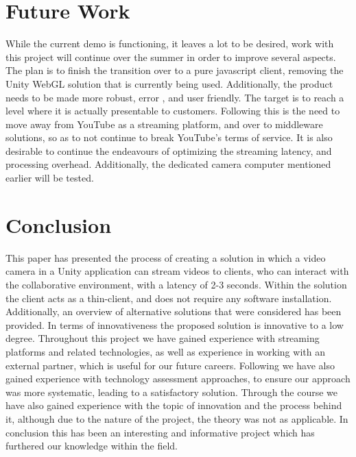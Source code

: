 \section{Future Work}
While the current demo is functioning, it leaves a lot to be desired, work with this project will continue over the summer in order to improve several aspects. The plan is to finish the transition over to a pure javascript client, removing the Unity WebGL solution that is currently being used. Additionally, the product needs to be made more robust, error , and user friendly. The target is to reach a level where it is actually presentable to customers.
Following this is the need to move away from YouTube as a streaming platform, and over to middleware solutions, so as to not continue to break YouTube's terms of service.
It is also desirable to continue the endeavours of optimizing the streaming latency, and processing overhead. Additionally, the dedicated camera computer mentioned earlier will be tested.

\section{Conclusion}
This paper has presented the process of creating a solution in which a video camera in a Unity application can stream videos to clients, who can interact with the collaborative environment, with a latency of 2-3 seconds. Within the solution the client acts as a thin-client, and does not require any software installation. Additionally, an overview of alternative solutions that were considered has been provided. In terms of innovativeness the proposed solution is innovative to a low degree.
Throughout this project we have gained experience with streaming platforms and related technologies, as well as experience in working with an external partner, which is useful for our future careers. Following we have also gained experience with technology assessment approaches, to ensure our approach was more systematic, leading to a satisfactory solution. Through the course we have also gained experience with the topic of innovation and the process behind it, although due to the nature of the project, the theory was not as applicable.
In conclusion this has been an interesting and informative project which has furthered our knowledge within the field.




        
